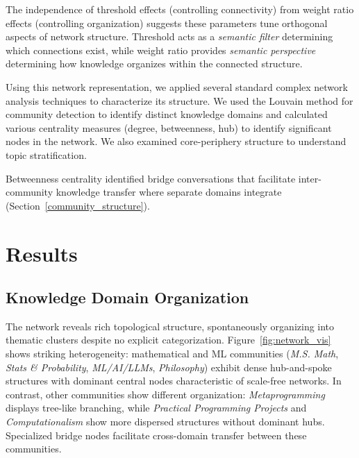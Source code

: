 \documentclass{svproc}
\begin{document}
The independence of threshold effects (controlling connectivity) from weight ratio effects (controlling organization) suggests these parameters tune orthogonal aspects of network structure. Threshold acts as a \emph{semantic filter} determining which connections exist, while weight ratio provides \emph{semantic perspective} determining how knowledge organizes within the connected structure.

Using this network representation, we applied several standard complex network analysis techniques to characterize its structure. We used the Louvain method \cite{blondel2008} for community detection to identify distinct knowledge domains and calculated various centrality measures (degree, betweenness, hub) to identify significant nodes in the network. We also examined core-periphery structure to understand topic stratification.

Betweenness centrality identified bridge conversations that facilitate inter-community knowledge transfer where separate domains integrate (Section~\ref{community_structure}).

\section{Results}

\subsection{Knowledge Domain Organization}

The network reveals rich topological structure, spontaneously organizing into thematic clusters despite no explicit categorization. Figure~\ref{fig:network_vis} shows striking heterogeneity: mathematical and ML communities (\emph{M.S. Math}, \emph{Stats \& Probability}, \emph{ML/AI/LLMs}, \emph{Philosophy}) exhibit dense hub-and-spoke structures with dominant central nodes characteristic of scale-free networks. In contrast, other communities show different organization: \emph{Metaprogramming} displays tree-like branching, while \emph{Practical Programming Projects} and \emph{Computationalism} show more dispersed structures without dominant hubs. Specialized bridge nodes facilitate cross-domain transfer between these communities.
\end{document}
